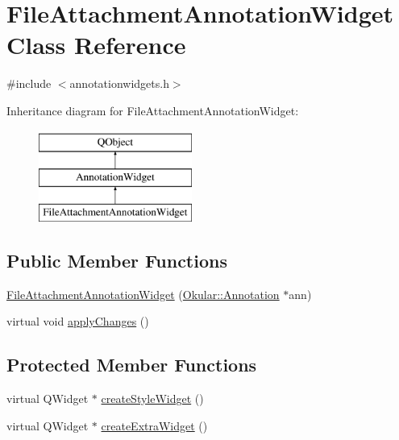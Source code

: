 \hypertarget{classFileAttachmentAnnotationWidget}{\section{File\+Attachment\+Annotation\+Widget Class Reference}
\label{classFileAttachmentAnnotationWidget}
}


{\ttfamily \#include $<$annotationwidgets.\+h$>$}

Inheritance diagram for File\+Attachment\+Annotation\+Widget\+:\begin{figure}[H]
\begin{center}
\leavevmode
\includegraphics[height=3.000000cm]{classFileAttachmentAnnotationWidget}
\end{center}
\end{figure}
\subsection*{Public Member Functions}
\begin{DoxyCompactItemize}
\item 
\hyperlink{classFileAttachmentAnnotationWidget_a3b621dfe0d8287ccb859b2b8e2cffe9e}{File\+Attachment\+Annotation\+Widget} (\hyperlink{classOkular_1_1Annotation}{Okular\+::\+Annotation} $\ast$ann)
\item 
virtual void \hyperlink{classFileAttachmentAnnotationWidget_a38fef39135d564be132754fcc4dbdf79}{apply\+Changes} ()
\end{DoxyCompactItemize}
\subsection*{Protected Member Functions}
\begin{DoxyCompactItemize}
\item 
virtual Q\+Widget $\ast$ \hyperlink{classFileAttachmentAnnotationWidget_ab48428e35499d975f3a758d111711db8}{create\+Style\+Widget} ()
\item 
virtual Q\+Widget $\ast$ \hyperlink{classFileAttachmentAnnotationWidget_a07cbdc3d89b1f92c54baab1a4551627f}{create\+Extra\+Widget} ()
\end{DoxyCompactItemize}
